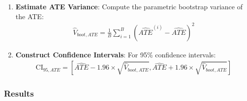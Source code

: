 \documentclass[11pt]{article}
\numberwithin{equation}{section}
\begin{document}
\begin{algorithm}
\begin{enumerate}
        \item \textbf{Estimate ATE Variance}: Compute the parametric bootstrap variance of the ATE:
        \begin{align}
            \hat{V}_{boot, ATE} = \frac{1}{B} \sum_{i=1}^B \left(\widehat{ATE}^{(i)} - \widehat{ATE}\right)^2
        \end{align}
        
        \item \textbf{Construct Confidence Intervals}: For 95\% confidence intervals:
        \begin{align}
            \text{CI}_{95, ATE} = \left[\widehat{ATE} - 1.96 \times \sqrt{\hat{V}_{boot, ATE}}, \widehat{ATE} + 1.96 \times \sqrt{\hat{V}_{boot, ATE}}\right]
        \end{align}
    \end{enumerate}
\end{algorithm}


    
    
    

\newpage

\subsubsection{Results}
\end{document}
